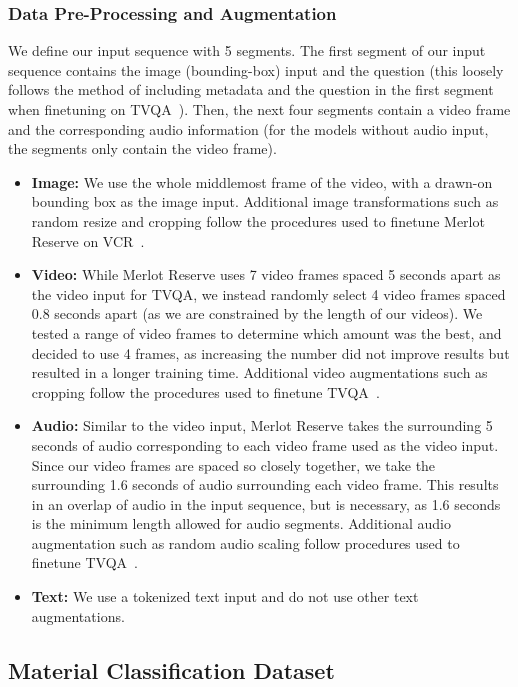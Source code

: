 \documentclass[runningheads]{llncs}
\begin{document}
\subsubsection{Data Pre-Processing and Augmentation} We define our input sequence with 5 segments. The first segment of our input sequence contains the image (bounding-box) input and the question (this loosely follows the method of including metadata and the question in the first segment when finetuning on TVQA~\cite{lei2018tvqa}). Then, the next four segments contain a video frame and the corresponding audio information (for the models without audio input, the segments only contain the video frame).   

\begin{itemize}
    \item \textbf{Image:} We use the whole middlemost frame of the video, with a drawn-on bounding box as the image input. Additional image transformations such as random resize and cropping follow the procedures used to finetune Merlot Reserve on VCR~\cite{zellers2022merlotreserve}. 
    \item \textbf{Video:} While Merlot Reserve uses 7 video frames spaced 5 seconds apart as the video input for TVQA, we instead randomly select 4 video frames spaced 0.8 seconds apart (as we are constrained by the length of our videos). We tested a range of  video frames to determine which amount was the best, and decided to use 4 frames, as increasing the number did not improve results but resulted in a longer training time. Additional video augmentations such as cropping follow the procedures used to finetune TVQA~\cite{zellers2022merlotreserve}. 
    \item \textbf{Audio:} Similar to the video input, Merlot Reserve takes the surrounding 5 seconds of audio corresponding to each video frame used as the video input. Since our video frames are spaced so closely together, we take the surrounding 1.6 seconds of audio surrounding each video frame. This results in an overlap of audio in the input sequence, but is necessary, as 1.6 seconds is the minimum length allowed for audio segments. Additional audio augmentation such as random audio scaling follow procedures used to finetune TVQA~\cite{zellers2022merlotreserve}.  
    \item \textbf{Text:} We use a tokenized text input and do not use other text augmentations.
\end{itemize}

\subsection{Material Classification Dataset}
\end{document}
